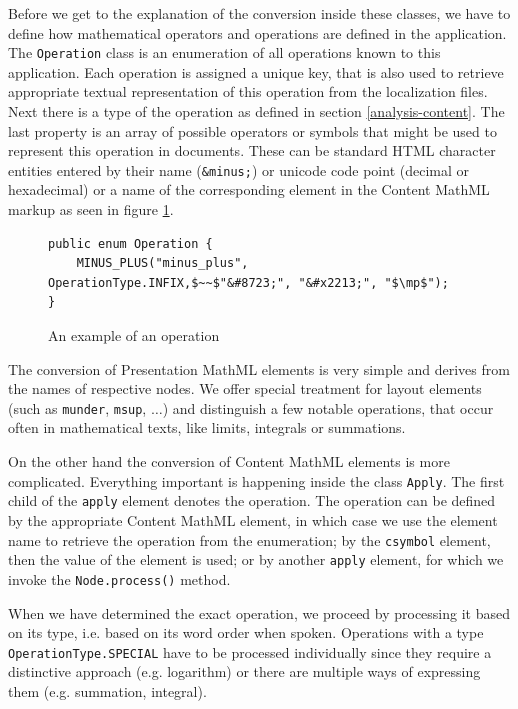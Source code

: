 \documentclass[11pt,oneside,final]{fithesis2}
\begin{document}
Before we get to the explanation of the conversion inside these classes, we have to define how mathematical operators and operations are defined in the application. The \texttt{Operation} class is an enumeration of all operations known to this application. Each operation is assigned a unique key, that is also used to retrieve appropriate textual representation of this operation from the localization files. Next there is a type of the operation as defined in section \ref{analysis-content}. The last property is an array of possible operators or symbols that might be used to represent this operation in documents. These can be standard HTML character entities entered by their name (\texttt{\&minus;}) or unicode code point (decimal or hexadecimal) or a name of the corresponding element in the Content MathML markup as seen in figure \ref{fig:converter-operation}.

\begin{figure}[!ht]
\begin{lstlisting}[mathescape=true]
public enum Operation {
	MINUS_PLUS("minus_plus", OperationType.INFIX,$~~$"&#8723;", "&#x2213;", "$\mp$");
}
\end{lstlisting}
\caption{An example of an operation}
\label{fig:converter-operation}
\end{figure}

The conversion of Presentation MathML elements is very simple and derives from the names of respective nodes. We offer special treatment for layout elements (such as \texttt{munder}, \texttt{msup}, $\ldots$) and distinguish a few notable operations, that occur often in mathematical texts, like limits, integrals or summations. 

On the other hand the conversion of Content MathML elements is more complicated. Everything important is happening inside the class \texttt{Apply}. The first child of the \texttt{apply} element denotes the operation. The operation can be defined by the appropriate Content MathML element, in which case we use the element name to retrieve the operation from the enumeration; by the \texttt{csymbol} element, then the value of the element is used; or by another \texttt{apply} element, for which we invoke the \texttt{Node.process()} method. 

When we have determined the exact operation, we proceed by processing it based on its type, i.e. based on its word order when spoken. Operations with a type \texttt{OperationType.SPECIAL} have to be processed individually since they require a distinctive approach (e.g. logarithm) or there are multiple ways of expressing them (e.g. summation, integral).
\end{document}
